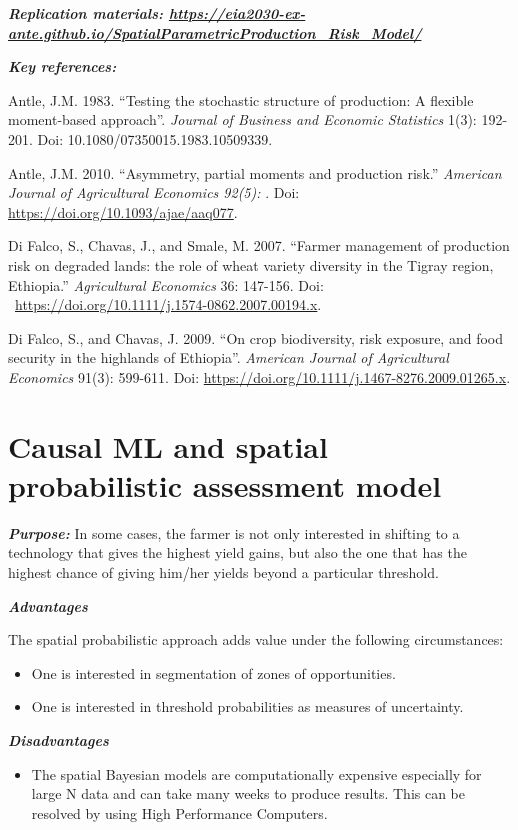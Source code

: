 \documentclass[
  letterpaper,
  DIV=11,
  numbers=noendperiod]{scrreprt}
\providecommand{\tightlist}{%
  \setlength{\itemsep}{0pt}\setlength{\parskip}{0pt}}\usepackage{longtable,booktabs,array}
\begin{document}
\textbf{\emph{Replication materials:
\url{https://eia2030-ex-ante.github.io/SpatialParametricProduction_Risk_Model/}}}

\textbf{\emph{Key references:}}

Antle, J.M. 1983. ``Testing the stochastic structure of production: A
flexible moment-based approach''. \emph{Journal of Business and Economic
Statistics} 1(3): 192-201. Doi: 10.1080/07350015.1983.10509339.

Antle, J.M. 2010. ``Asymmetry, partial moments and production risk.''
\emph{American Journal of Agricultural Economics 92(5):} . Doi:
\url{https://doi.org/10.1093/ajae/aaq077}.

Di Falco, S., Chavas, J., and Smale, M. 2007. ``Farmer management of
production risk on degraded lands: the role of wheat variety diversity
in the Tigray region, Ethiopia.'' \emph{Agricultural Economics} 36:
147-156. Doi: ~\url{https://doi.org/10.1111/j.1574-0862.2007.00194.x}.

Di Falco, S., and Chavas, J. 2009. ``On crop biodiversity, risk
exposure, and food security in the highlands of Ethiopia''.
\emph{American Journal of Agricultural Economics} 91(3): 599-611. Doi:
\url{https://doi.org/10.1111/j.1467-8276.2009.01265.x}.

\section{Causal ML and spatial probabilistic assessment
model}\label{causal-ml-and-spatial-probabilistic-assessment-model}

\textbf{\emph{Purpose:}} In some cases, the farmer is not only
interested in shifting to a technology that gives the highest yield
gains, but also the one that has the highest chance of giving him/her
yields beyond a particular threshold.

\textbf{\emph{Advantages}}

The spatial probabilistic approach adds value under the following
circumstances:

\begin{itemize}
\item
  One is interested in segmentation of zones of opportunities.
\item
  One is interested in threshold probabilities as measures of
  uncertainty.
\end{itemize}

\textbf{\emph{Disadvantages}}

\begin{itemize}
\tightlist
\item
  The spatial Bayesian models are computationally expensive especially
  for large N data and can take many weeks to produce results. This can
  be resolved by using High Performance Computers.
\end{itemize}
\end{document}
